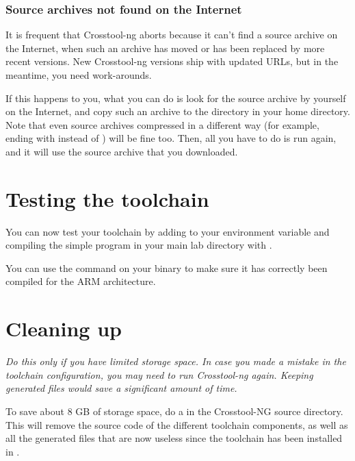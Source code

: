 \subsubsection{Source archives not found on the Internet}

It is frequent that Crosstool-ng aborts because it can't find a
source archive on the Internet, when such an archive has moved or has
been replaced by more recent versions. New Crosstool-ng versions ship
with updated URLs, but in the meantime, you need work-arounds.

If this happens to you, what you can do is look for the source archive by
yourself on the Internet, and copy such an archive to the 
directory in your home directory. Note that even source archives
compressed in a different way (for example, ending with 
instead of ) will be fine too. Then, all you have to do is run
 again, and it will use the source archive that you
downloaded.

\section{Testing the toolchain}

You can now test your toolchain by adding
 to your
 environment variable and compiling the simple
 program in your main lab directory with
.

You can use the  command on your binary to make sure it has
correctly been compiled for the ARM architecture.

\section{Cleaning up}

{\em Do this only if you have limited storage space. In case you made a
mistake in the toolchain configuration, you may need to run Crosstool-ng
again. Keeping generated files would save a significant amount of time.}

To save about 8 GB of storage space, do a  in the
Crosstool-NG source directory. This will remove the source code of the
different toolchain components, as well as all the generated files
that are now useless since the toolchain has been installed in
.
